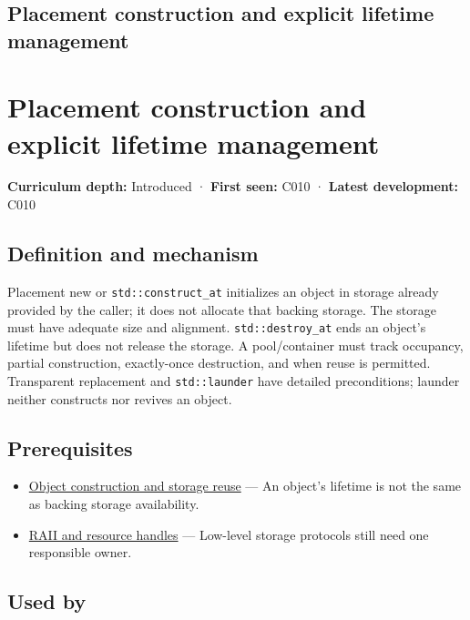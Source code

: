 \hypertarget{appendix-f56c3e43fd4e}{}
\section*{Placement construction and explicit lifetime management}
\chapter{Placement construction and explicit lifetime management}\label{appendix-f56c3e43fd4e-placement-construction-and-explicit-lifetime-management}

\textbf{Curriculum depth:} Introduced · \textbf{First seen:} C010 · \textbf{Latest development:} C010

\section{Definition and mechanism}\label{appendix-f56c3e43fd4e-definition-and-mechanism}

Placement new or \texttt{std::construct\_at} initializes an object in storage already provided by the caller; it does not allocate that backing storage. The storage must have adequate size and alignment. \texttt{std::destroy\_at} ends an object's lifetime but does not release the storage. A pool/container must track occupancy, partial construction, exactly-once destruction, and when reuse is permitted. Transparent replacement and \texttt{std::launder} have detailed preconditions; launder neither constructs nor revives an object.

\section{Prerequisites}\label{appendix-f56c3e43fd4e-prerequisites}

\begin{itemize}
\tightlist
\item
  \hyperref[appendix-a82f9c438857]{Object construction and storage reuse} --- An object's lifetime is not the same as backing storage availability.
\item
  \hyperref[appendix-69739d3ab49b]{RAII and resource handles} --- Low-level storage protocols still need one responsible owner.
\end{itemize}

\section{Used by}\label{appendix-f56c3e43fd4e-used-by}


